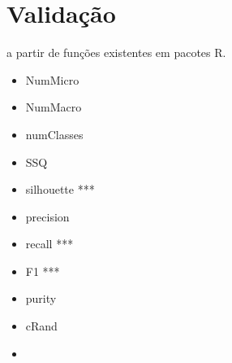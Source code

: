 \section{Validação}

a partir de funções existentes em pacotes R.

\begin{itemize}
    \item NumMicro
    \item NumMacro
    \item numClasses
    \item SSQ
    \item silhouette ***
    \item precision
    \item recall ***
    \item F1 ***
    \item purity
    \item cRand
    \item {}
\end{itemize}

